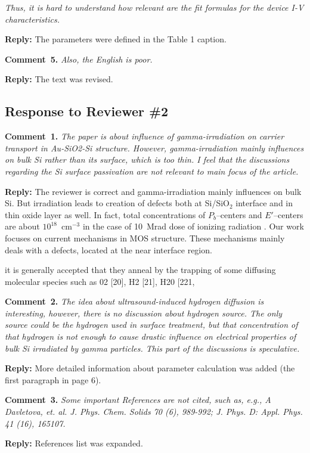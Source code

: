 \documentclass[aip,jap,preprint]{revtex4-1}
\begin{document}
\emph{Thus, it is hard to understand how relevant are the fit formulas for the device I-V characteristics.}


\noindent
\textcolor[rgb]{0.51,0.00,0.00}{\textbf{Reply:}}
The parameters were defined in the Table 1 caption.




\noindent
\textcolor[rgb]{0.00,0.50,1.00}{\textbf{Comment~5.}}
\emph{Also, the English is poor.}


\noindent
\textcolor[rgb]{0.51,0.00,0.00}{\textbf{Reply:}}
The text was revised.


\subsection*{Response to Reviewer \#2 }

\noindent
\textcolor[rgb]{0.00,0.50,1.00}{\textbf{Comment~1.}}
\emph{ The paper is about influence of gamma-irradiation on carrier transport in Au-SiO2-Si structure. However, gamma-irradiation mainly influences on bulk Si rather than its surface, which is too thin. I feel that the discussions regarding the Si surface passivation are not relevant to main focus of the article.}

\noindent
\textcolor[rgb]{0.51,0.00,0.00}{\textbf{Reply:}}
The reviewer is correct and gamma-irradiation mainly influences on bulk Si.
But irradiation leads to creation of defects both at Si/SiO$_2$  interface and in thin oxide layer as well.
In fact, total concentrations of $P_b$--centers and $E'$--centers are about $10^{18}$~cm$^{-3}$ 
in the case of 10~Mrad dose of ionizing radiation \cite{Fleetwood,PersenkovBook}. 
Our work focuses on current mechanisms in MOS structure.
These mechanisms mainly deals with a defects, located at the near interface region. 


it  is generally accepted that  they  anneal by  the 
trapping  of  some diffusing molecular species  such as 02 
[20], H2 [21], H20 [221,




\noindent
\textcolor[rgb]{0.00,0.50,1.00}{\textbf{Comment~2.}}
\emph{ The idea about ultrasound-induced hydrogen diffusion is interesting, however, there is no discussion about hydrogen source. The only source could be the hydrogen used in surface treatment, but that concentration of that hydrogen is not enough to cause drastic influence on electrical properties of bulk Si irradiated by gamma particles. This part of the discussions is speculative.}

\noindent
\textcolor[rgb]{0.51,0.00,0.00}{\textbf{Reply:}}
More detailed information about parameter calculation was added (the first paragraph in page 6).



\noindent
\textcolor[rgb]{0.00,0.50,1.00}{\textbf{Comment~3.}}
\emph{ Some important References are not cited, such as, e.g., A Davletova, et. al. J. Phys. Chem. Solids 70 (6), 989-992; J. Phys. D: Appl. Phys. 41 (16), 165107.}

\noindent
\textcolor[rgb]{0.51,0.00,0.00}{\textbf{Reply:}}
References list was expanded.



\end{document}
